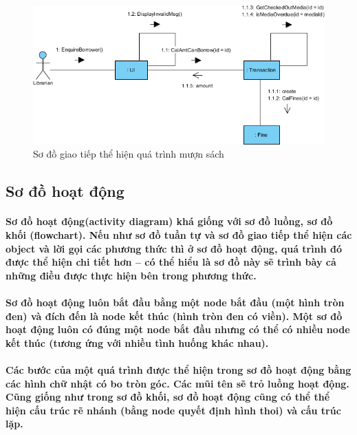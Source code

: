 \documentclass{article}
\begin{document}
  \begin{figure}[!ht]
    \centering
    \includegraphics[scale=0.7]{../pictures/diagrams/communication/communication-diagram-1.png}
    \caption{Sơ đồ giao tiếp thể hiện quá trình mượn sách}
  \end{figure}


  \subsection{Sơ đồ hoạt động}

  \paragraph{\textnormal{
    Sơ đồ hoạt động(activity diagram) khá giống với sơ đồ luồng, sơ đồ khối (flowchart). Nếu như sơ đồ tuần tự và sơ đồ giao tiếp thể hiện các object và lời gọi các phương thức thì ở sơ đồ hoạt động, quá trình đó được thể hiện chi tiết hơn -- có thể hiểu là sơ đồ này sẽ trình bày cả những điều được thực hiện bên trong phương thức.
  }}

  \paragraph{\textnormal{
    Sơ đồ hoạt động luôn bắt đầu bằng một node bắt đầu (một hình tròn đen) và đích đến là node kết thúc (hình tròn đen có viền). Một sơ đồ hoạt động luôn có đúng một node bắt đầu nhưng có thể có nhiều node kết thúc (tương ứng với nhiều tình huống khác nhau).
  }}

  \paragraph{\textnormal{
    Các bước của một quá trình được thể hiện trong sơ đồ hoạt động bằng các hình chữ nhật có bo tròn góc. Các mũi tên sẽ trỏ luồng hoạt động. Cũng giống như trong sơ đồ khối, sơ đồ hoạt động cũng có thể thể hiện cấu trúc rẽ nhánh (bằng node quyết định hình thoi) và cấu trúc lặp.
  }}
\end{document}
